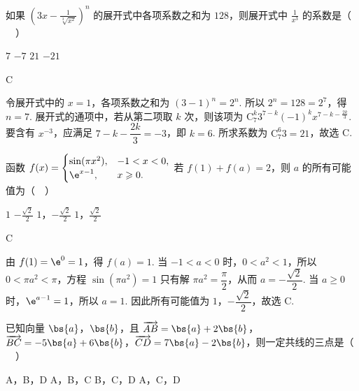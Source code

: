 \begin{problem}
如果 \(\left(3x - \frac{1}{\sqrt[3]{x^2}}\right)^n\) 的展开式中各项系数之和为 \(128\)，则展开式中 \(\frac{1}{x^3}\) 的系数是（\(\quad\)）

\choices
    {\(7\)}
    {\(-7\)}
    {\(21\)}
    {\(-21\)}
\end{problem}

\begin{answer}
C
\end{answer}

\begin{solution}
令展开式中的 \(x=1\)，各项系数之和为 \(\left(3-1\right)^n=2^n\). 所以 \(2^n=128=2^7\)，得 \(n=7\). 展开式的通项中，若从第二项取 \(k\) 次，则该项为
\(\mathrm C_7^k3^{7-k}(-1)^kx^{7-k-\frac{2k}{3}}\). 要含有 \(x^{-3}\)，应满足 \(7-k-\dfrac{2k}{3}=-3\)，即 \(k=6\). 所求系数为 \(\mathrm C_7^6 3=21\)，故选 C.
\end{solution}

\begin{problem}
函数 \( f(x) = \begin{cases}
\sin (\pi x^2), & -1 < x < 0,\\
\e^{x - 1}, & x \geqslant 0.
\end{cases} \) 若 \( f(1) + f(a) = 2 \)，则 \( a \) 的所有可能值为（\(\quad\)）

\choices
    {\(1\)}
    {\( -\frac{\sqrt{2}}{2} \)}
    {\(1\)，\(-\frac{\sqrt{2}}{2}\)}
    {\(1\)，\(\frac{\sqrt{2}}{2}\)}
\end{problem}

\begin{answer}
C
\end{answer}

\begin{solution}
由 \(f(1)=\e^0=1\)，得 \(f(a)=1\). 当 \(-1<a<0\) 时，\(0<a^2<1\)，所以 \(0<\pi a^2<\pi\)，方程 \(\sin(\pi a^2)=1\) 只有解 \(\pi a^2=\dfrac\pi2\)，从而 \(a=-\dfrac{\sqrt2}{2}\). 当 \(a\geqslant0\) 时，\(\e^{a-1}=1\)，所以 \(a=1\). 因此所有可能值为 \(1\)，\(-\dfrac{\sqrt2}{2}\)，故选 C.
\end{solution}

\begin{problem}
已知向量 \(\bs{a}\)，\(\bs{b}\)，且 \(\overrightarrow{AB} = \bs{a} + 2\bs{b}\)，\(\overrightarrow{BC} = -5\bs{a} + 6\bs{b}\)，\(\overrightarrow{CD} = 7\bs{a} - 2\bs{b}\)，则一定共线的三点是（\(\quad\)）

\choices
    {A，B，D}
    {A，B，C}
    {B，C，D}
    {A，C，D}
\end{problem}

